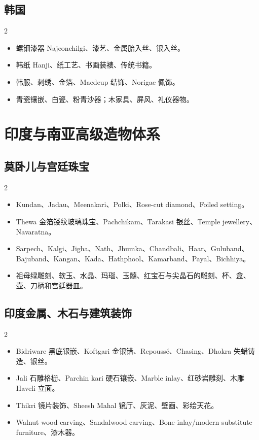 \documentclass[lang=en,a4paper,11pt]{elegantpaper}
\begin{document}
\subsection{韩国}


\begin{multicols}{2}
\begin{itemize}
\item 螺钿漆器 Najeonchilgi、漆艺、金属胎入丝、银入丝。
\item 韩纸 Hanji、纸工艺、书画装裱、传统书籍。
\item 韩服、刺绣、金箔、Maedeup 结饰、Norigae 佩饰。
\item 青瓷镶嵌、白瓷、粉青沙器；木家具、屏风、礼仪器物。
\end{itemize}
\end{multicols}

\section{印度与南亚高级造物体系}


\subsection{莫卧儿与宫廷珠宝}


\begin{multicols}{2}
\begin{itemize}
\item Kundan、Jadau、Meenakari、Polki、Rose-cut diamond、Foiled setting。
\item Thewa 金箔镂纹玻璃珠宝、Pachchikam、Tarakasi 银丝、Temple jewellery、Navaratna。
\item Sarpech、Kalgi、Jigha、Nath、Jhumka、Chandbali、Haar、Guluband、Bajuband、Kangan、Kada、Hathphool、Kamarband、Payal、Bichhiya。
\item 祖母绿雕刻、软玉、水晶、玛瑙、玉髓、红宝石与尖晶石的雕刻、杯、盒、壶、刀柄和宫廷器皿。
\end{itemize}
\end{multicols}

\subsection{印度金属、木石与建筑装饰}


\begin{multicols}{2}
\begin{itemize}
\item Bidriware 黑底银嵌、Koftgari 金银错、Repoussé、Chasing、Dhokra 失蜡铸造、银丝。
\item Jali 石雕格栅、Parchin kari 硬石镶嵌、Marble inlay、红砂岩雕刻、木雕 Haveli 立面。
\item Thikri 镜片装饰、Sheesh Mahal 镜厅、灰泥、壁画、彩绘天花。
\item Walnut wood carving、Sandalwood carving、Bone-inlay/modern substitute furniture、漆木器。
\end{itemize}
\end{multicols}
\end{document}
